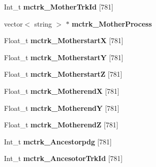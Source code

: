 \begin{DoxyCompactItemize}
\item 
\hypertarget{classanatree_a04b1220123db02a6917cc2c6ce100c06}{Int\-\_\-t {\bfseries mctrk\-\_\-\-Mother\-Trk\-Id} \mbox{[}781\mbox{]}}\label{classanatree_a04b1220123db02a6917cc2c6ce100c06}

\item 
\hypertarget{classanatree_a1f45b3bd87e1f3bb37859ea0798329da}{vector$<$ string $>$ $\ast$ {\bfseries mctrk\-\_\-\-Mother\-Process}}\label{classanatree_a1f45b3bd87e1f3bb37859ea0798329da}

\item 
\hypertarget{classanatree_a3b4485edc46b45be37d6ea38d2629e1c}{Float\-\_\-t {\bfseries mctrk\-\_\-\-Motherstart\-X} \mbox{[}781\mbox{]}}\label{classanatree_a3b4485edc46b45be37d6ea38d2629e1c}

\item 
\hypertarget{classanatree_ac56a676c4982deac5aab042c7998d18d}{Float\-\_\-t {\bfseries mctrk\-\_\-\-Motherstart\-Y} \mbox{[}781\mbox{]}}\label{classanatree_ac56a676c4982deac5aab042c7998d18d}

\item 
\hypertarget{classanatree_aeffbf022f82eb20ae259e1817ff3068e}{Float\-\_\-t {\bfseries mctrk\-\_\-\-Motherstart\-Z} \mbox{[}781\mbox{]}}\label{classanatree_aeffbf022f82eb20ae259e1817ff3068e}

\item 
\hypertarget{classanatree_adfdd1b7dc34dfc7d5ba867aa4fa6c539}{Float\-\_\-t {\bfseries mctrk\-\_\-\-Motherend\-X} \mbox{[}781\mbox{]}}\label{classanatree_adfdd1b7dc34dfc7d5ba867aa4fa6c539}

\item 
\hypertarget{classanatree_ad7f186037edd08f3bb7dfc7d577da24b}{Float\-\_\-t {\bfseries mctrk\-\_\-\-Motherend\-Y} \mbox{[}781\mbox{]}}\label{classanatree_ad7f186037edd08f3bb7dfc7d577da24b}

\item 
\hypertarget{classanatree_affa718ed59700a207afb6e4f2e362bab}{Float\-\_\-t {\bfseries mctrk\-\_\-\-Motherend\-Z} \mbox{[}781\mbox{]}}\label{classanatree_affa718ed59700a207afb6e4f2e362bab}

\item 
\hypertarget{classanatree_afbed10f75092bd30f78f1ec68cac2698}{Int\-\_\-t {\bfseries mctrk\-\_\-\-Ancestorpdg} \mbox{[}781\mbox{]}}\label{classanatree_afbed10f75092bd30f78f1ec68cac2698}

\item 
\hypertarget{classanatree_aebdeea5f3b0e29cae4246b782de97837}{Int\-\_\-t {\bfseries mctrk\-\_\-\-Ancesotor\-Trk\-Id} \mbox{[}781\mbox{]}}\label{classanatree_aebdeea5f3b0e29cae4246b782de97837}


\end{DoxyCompactItemize}
